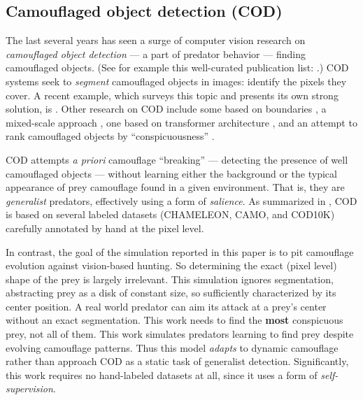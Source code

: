 \documentclass[acmtog]{acmart}
\newcommand{\jargon}[1]{\textit{#1}}
\begin{document}
\subsection{Camouflaged object detection (COD)}
The last several years has seen a surge of computer vision research on \jargon{camouflaged object detection} — a part of predator behavior — finding camouflaged objects. (See for example this well-curated publication list: \citet{visionxiang_cod}.) COD systems seek to \jargon{segment} camouflaged objects in images: identify the pixels they cover. A recent example, which surveys this topic and presents its own strong solution, is \citet{Zhang2022}. Other research on COD include some based on boundaries \cite{chen_boundary-guided_2022} \cite{sun_boundary-guided_2022}, a mixed-scale approach \cite{pang_zoom_2022}, one based on transformer architecture \cite{yin_camoformer_2022}, and an attempt to rank camouflaged objects by “conspicuousness” \cite{lv_cod_2022}.
\par
COD attempts \textit{a priori} camouflage “breaking” — detecting the presence of well camouflaged objects — without learning either the background or the typical appearance of prey camouflage found in a given environment. That is, they are \jargon{generalist} predators, effectively using a form of \jargon{salience}. As summarized in \citet{Zhang2022}, COD is based on several labeled datasets (CHAMELEON, CAMO, and COD10K) carefully annotated by hand at the pixel level.
\par
In contrast, the goal of the simulation reported in this paper is to pit camouflage evolution against vision-based hunting. So determining the exact (pixel level) shape of the prey is largely irrelevant. This simulation ignores segmentation, abstracting prey as a disk of constant size, so sufficiently characterized by its center position. A real world predator can aim its attack at a prey's center without an exact segmentation. This work needs to find the \textbf{most} conspicuous prey, not all of them. This work simulates predators learning to find prey despite evolving camouflage patterns. Thus this model \jargon{adapts} to dynamic camouflage rather than approach COD as a static task of generalist detection. Significantly, this work requires no hand-labeled datasets at all, since it uses a form of \jargon{self-supervision}.
\par

\end{document}
